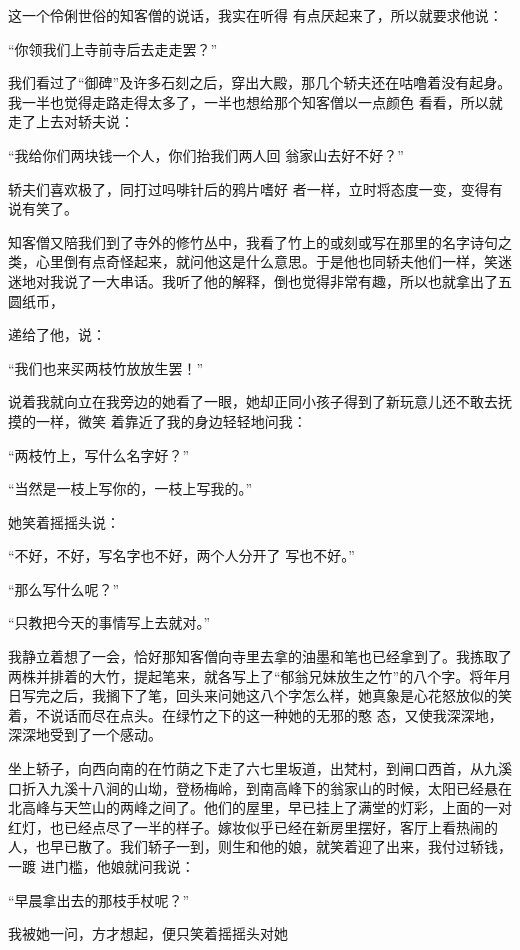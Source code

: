 \documentclass{article}
\begin{document}
这一个伶俐世俗的知客僧的说话，我实在听得
有点厌起来了，所以就要求他说： 


“你领我们上寺前寺后去走走罢？” 

我们看过了“御碑”及许多石刻之后，穿出大殿，那几个轿夫还在咕噜着没有起身。我一半也觉得走路走得太多了，一半也想给那个知客僧以一点颜色
看看，所以就走了上去对轿夫说： 

“我给你们两块钱一个人，你们抬我们两人回
翁家山去好不好？” 

轿夫们喜欢极了，同打过吗啡针后的鸦片嗜好
者一样，立时将态度一变，变得有说有笑了。 

知客僧又陪我们到了寺外的修竹丛中，我看了竹上的或刻或写在那里的名字诗句之类，心里倒有点奇怪起来，就问他这是什么意思。于是他也同轿夫他们一样，笑迷迷地对我说了一大串话。我听了他的解释，倒也觉得非常有趣，所以也就拿出了五圆纸币，
\newpage

递给了他，说： 


“我们也来买两枝竹放放生罢！” 

说着我就向立在我旁边的她看了一眼，她却正同小孩子得到了新玩意儿还不敢去抚摸的一样，微笑
着靠近了我的身边轻轻地问我： 


“两枝竹上，写什么名字好？” 


“当然是一枝上写你的，一枝上写我的。” 


她笑着摇摇头说： 

“不好，不好，写名字也不好，两个人分开了
写也不好。” 


“那么写什么呢？” 


“只教把今天的事情写上去就对。” 

\newpage

我静立着想了一会，恰好那知客僧向寺里去拿的油墨和笔也已经拿到了。我拣取了两株并排着的大竹，提起笔来，就各写上了“郁翁兄妹放生之竹”的八个字。将年月日写完之后，我搁下了笔，回头来问她这八个字怎么样，她真象是心花怒放似的笑着，不说话而尽在点头。在绿竹之下的这一种她的无邪的憨
态，又使我深深地，深深地受到了一个感动。 

坐上轿子，向西向南的在竹荫之下走了六七里坂道，出梵村，到闸口西首，从九溪口折入九溪十八涧的山坳，登杨梅岭，到南高峰下的翁家山的时候，太阳已经悬在北高峰与天竺山的两峰之间了。他们的屋里，早已挂上了满堂的灯彩，上面的一对红灯，也已经点尽了一半的样子。嫁妆似乎已经在新房里摆好，客厅上看热闹的人，也早已散了。我们轿子一到，则生和他的娘，就笑着迎了出来，我付过轿钱，一踱
进门槛，他娘就问我说： 


“早晨拿出去的那枝手杖呢？” 

我被她一问，方才想起，便只笑着摇摇头对她
\newpage
\end{document}
